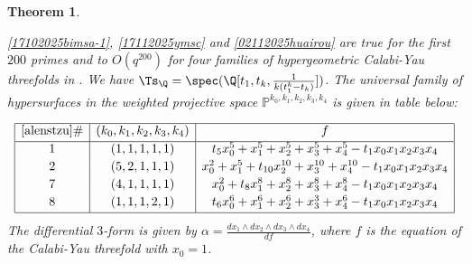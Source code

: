 \documentclass[11pt,leqno]{article}
\newtheorem{theo}{Theorem}
\theoremstyle{remark}
\theoremstyle{definition}
\begin{document}
\begin{theo}
\label{28112025bri}

\cref{17102025bimsa-1}, \cref{17112025ymsc} and \cref{02112025huairou} are true for the first $200$ primes and to $O(q^{200})$ for four families of hypergeometric Calabi-Yau threefolds in  
\cite{Morrison:1991cd}. We have $\Ts_\Q=\spec(\Q[t_1, t_k, \frac{1}{k(t_1^k-t_k)}])$. The universal family of hypersurfaces in the weighted projective space $\mathbb{P}^{k_0,k_1,k_2,k_3,k_4}$ is given in table below:

\begin{equation*}
\begin{array}{|c|c|c|}
\hline
\cite{alenstzu} \# & (k_0,k_1,k_2,k_3,k_4) &  f\\[2pt]
   \hline
1 & (1,1,1,1,1) & t_5x_0^5 + x_1^5 + x_2^5+x_3^5 + x_4^5 -t_1x_0x_1x_2x_3x_4\\[2pt]
2 & (5,2,1,1,1) & x_0^2 + x_1^5 + t_{10}x_2^{10} + x_3^{10} + x_4^{10} - t_1 x_0x_1x_2x_3x_4\\[2pt]
7 & (4,1,1,1,1) & x_0^2 + t_8x_1^8 + x_2^8 + x_3^8 + x_4^8 - t_1x_0x_1x_2x_3x_4\\[2pt]
8 &   (1,1,1,2,1) & t_6x_0^6 + x_1^6 + x_2^6 + x_3^3 + x_4^6 - t_1x_0x_1x_2x_3x_4\\[2pt]
\hline
\end{array}
\end{equation*}
The differential $3$-form is given by 
$\alpha=\frac{dx_1\wedge dx_2\wedge dx_3\wedge dx_4}{df}$, 
where $f$ is the equation of the Calabi-Yau threefold  with $x_0=1$. 

\end{theo}
\end{document}
